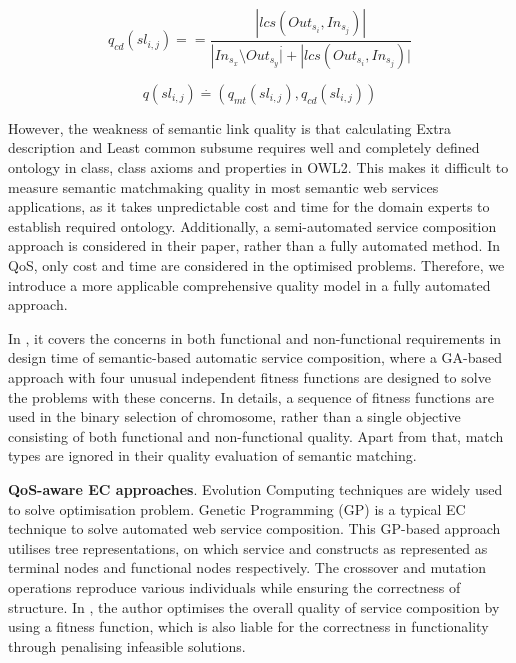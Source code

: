 \documentclass{llncs}
\begin{document}
\begin{equation}
q_{cd}(sl{_{i,j}})={=} \frac{|lcs(Out_{s_i},In_{s_j})|}{|In_{s_{x}} \setminus Out_{s{_y}} \stackrel{.}| +|lcs(Out_{s_i},In_{s_j})| }
 \label{equation2}
\end{equation}

\begin{equation}
\label{equation3}
q(sl{_{i,j}}) \stackrel{.}{=} (q_{mt}(sl_{i,j}), q_{cd}(sl_{i,j}))
\end{equation}

However, the weakness of semantic link quality is that calculating Extra description and Least common subsume requires well and completely defined ontology in class, class axioms and properties in OWL2. This makes it difficult to measure semantic matchmaking quality in most semantic web services applications, as it takes unpredictable cost and time for the domain experts to establish required ontology. Additionally, a semi-automated service composition approach is considered in their paper, rather than a fully automated method. In QoS, only cost and time are considered in the optimised problems. Therefore, we introduce a more applicable comprehensive quality model in a fully automated approach.

In \cite{fanjiang2014semantic}, it covers the concerns in both functional and non-functional requirements in design time of semantic-based automatic service composition, where a GA-based approach with four unusual independent fitness functions are designed to solve the problems with these concerns. In details, a sequence of fitness functions are used in the binary selection of chromosome, rather than a single objective consisting of both functional and non-functional quality. Apart from that, match types are ignored in their quality evaluation of semantic matching.

\textbf{QoS-aware EC approaches}. Evolution Computing techniques are widely used to solve optimisation problem. Genetic Programming (GP) \cite{da2016particle,da2015graphevol} is a typical EC technique to solve automated web service composition. This GP-based approach utilises tree representations, on which service and constructs as represented as terminal nodes and functional nodes respectively. The crossover and mutation operations reproduce various individuals while ensuring the correctness of structure. In \cite{yu2013adaptive}, the author optimises the overall quality of service composition by using a fitness function, which is also liable for the correctness in functionality through penalising infeasible solutions. 
\end{document}
